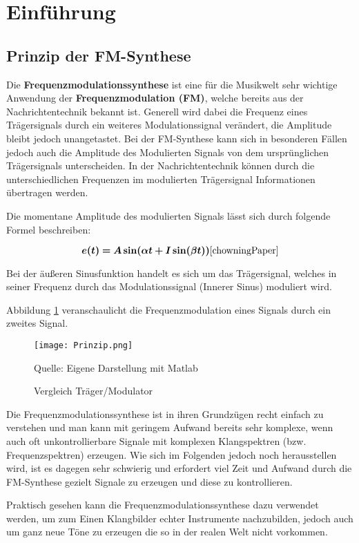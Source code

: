 \section{Einführung}

\FloatBarrier
\subsection{Prinzip der FM-Synthese}
Die \textbf{Frequenzmodulationssynthese} ist eine für die Musikwelt sehr wichtige Anwendung der \textbf{Frequenzmodulation (FM)}, welche bereits aus der Nachrichtentechnik bekannt ist. Generell wird dabei die Frequenz eines Trägersignals durch ein weiteres Modulationssignal verändert, die Amplitude bleibt jedoch unangetastet. Bei der FM-Synthese kann sich in besonderen Fällen jedoch auch die Amplitude des Modulierten Signals von dem ursprünglichen Trägersignals unterscheiden. In der Nachrichtentechnik können durch die unterschiedlichen Frequenzen im modulierten Trägersignal Informationen übertragen werden. 

Die momentane Amplitude des modulierten Signals lässt sich durch folgende Formel beschreiben:

\[
\bm{e(t) = A\sin(\alpha t + I\sin(\beta t))} \cite{chowningPaper}
\]

Bei der äußeren Sinusfunktion handelt es sich um das Trägersignal, welches in seiner Frequenz durch das Modulationssignal (Innerer Sinus) moduliert wird.

Abbildung \ref{fig:vergleichSignale} veranschaulicht die Frequenzmodulation eines Signals durch ein zweites Signal.

\begin{figure} [ht]
\centering
  \texttt{[image: Prinzip.png]}
\caption{Vergleich Träger/Modulator}
\label{fig:vergleichSignale}
Quelle: Eigene Darstellung mit Matlab
\end{figure}

Die Frequenzmodulationssynthese ist in ihren Grundzügen recht einfach zu verstehen und man kann mit geringem Aufwand bereits sehr komplexe, wenn auch oft unkontrollierbare Signale mit komplexen Klangspektren (bzw. Frequenzspektren) erzeugen. Wie sich im Folgenden jedoch noch herausstellen wird, ist es dagegen sehr schwierig und erfordert viel Zeit und Aufwand durch die FM-Synthese gezielt Signale zu erzeugen und diese zu kontrollieren.

Praktisch gesehen kann die Frequenzmodulationssynthese dazu verwendet werden, um zum Einen Klangbilder echter Instrumente nachzubilden, jedoch auch um ganz neue Töne zu erzeugen die so in der realen Welt nicht vorkommen.

